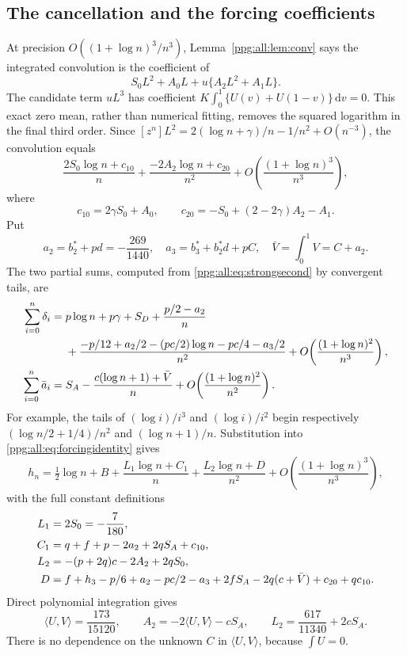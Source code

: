 \documentclass[11pt,letterpaper]{article}
\theoremstyle{remark}\newtheorem{remark}[theorem]{Remark}
\numberwithin{equation}{section}
\newcommand{\dd}{\mathrm d}
\newcommand{\ip}[2]{\langle #1,#2\rangle}
\begin{document}
\subsection{The cancellation and the forcing coefficients}
At precision $O((1+\log n)^3/n^3)$, Lemma~\ref{ppg:all:lem:conv} says the integrated convolution is the coefficient of
\begin{equation}\label{ppg:all:eq:thirdconvmodel}
 S_0L^2+A_0L+u\{A_2L^2+A_1L\}.
\end{equation}
The candidate term $uL^3$ has coefficient
$K\int_0^1\{U(v)+U(1-v)\}\,\dd v=0$. This exact zero mean, rather than numerical fitting, removes the squared logarithm in the final third order.
Since $[z^n]L^2=2(\log n+\gamma)/n-1/n^2+O(n^{-3})$, the convolution equals
\begin{equation}\label{ppg:all:eq:thirdconv}
 \frac{2S_0\log n+c_{10}}n+\frac{-2A_2\log n+c_{20}}{n^2}
       +O\!\left(\frac{(1+\log n)^3}{n^3}\right),
\end{equation}
where
\begin{equation}\label{ppg:all:eq:c1020}
 c_{10}=2\gamma S_0+A_0,\qquad
 c_{20}=-S_0+(2-2\gamma)A_2-A_1.
\end{equation}
Put
\begin{equation}\label{ppg:all:eq:a23}
 a_2=b_2^*+pd=-\frac{269}{1440},\quad
 a_3=b_3^*+b_2^*d+pC,\quad\bar V=\int_0^1V=C+a_2.
\end{equation}
The two partial sums, computed from \eqref{ppg:all:eq:strongsecond} by convergent tails, are
\begin{align}
 \sum_{i=0}^n\delta_i={}&p\log n+p\gamma+S_D+\frac{p/2-a_2}n\notag\\
 &+\frac{-p/12+a_2/2-(pc/2)\log n-pc/4-a_3/2}{n^2}
       +O\!\left(\frac{(1+\log n)^2}{n^3}\right),\label{ppg:all:eq:thirdDsum}\\
 \sum_{i=0}^n\bar a_i={}&S_A-\frac{c(\log n+1)+\bar V}n
       +O\!\left(\frac{(1+\log n)^2}{n^2}\right).\label{ppg:all:eq:thirdAsum}
\end{align}
For example, the tails of $(\log i)/i^3$ and $(\log i)/i^2$ begin respectively
$(\log n/2+1/4)/n^2$ and $(\log n+1)/n$. Substitution into \eqref{ppg:all:eq:forcingidentity} gives
\begin{equation}\label{ppg:all:eq:thirdh}
 h_n=\tfrac12\log n+B+\frac{L_1\log n+C_1}n
         +\frac{L_2\log n+D}{n^2}
         +O\!\left(\frac{(1+\log n)^3}{n^3}\right),
\end{equation}
with the full constant definitions
\begin{align}
 L_1&=2S_0=-\frac7{180},\notag\\
 C_1&=q+f+p-2a_2+2qS_A+c_{10},\notag\\
 L_2&=-(p+2q)c-2A_2+2qS_0,\label{ppg:all:eq:forcingThirdConstants}\\
 D&=f+h_3-p/6+a_2-pc/2-a_3
        +2fS_A-2q(c+\bar V)+c_{20}+qc_{10}.\notag
\end{align}
Direct polynomial integration gives
\begin{equation}\label{ppg:all:eq:L2eval}
 \ip UV=\frac{173}{15120},\qquad
 A_2=-2\ip UV-cS_A,\qquad
 L_2=\frac{617}{11340}+2cS_A.
\end{equation}
There is no dependence on the unknown $C$ in $\ip UV$, because $\int U=0$.
\end{document}
